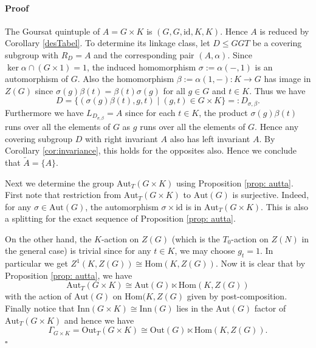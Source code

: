 \documentclass[12pt]{article}
\theoremstyle{change}
\newenvironment{proof}{\paragraph{Proof}}{\hfill$\square$}
\renewcommand{\le}{\leqslant} %
\newcommand{\Aut}{\mathrm{Aut}}
\newcommand{\Hom}{\mathrm{Hom}}
\newcommand{\id}{\mathrm{id}}
\newcommand{\Inn}{\mathrm{Inn}}
\newcommand{\Out}{\mathrm{Out}}
\newcommand{\1}{{\bf 1}}
\begin{document}
\begin{proof}
The Goursat quintuple of $A = G\times K$ is $(G, G, \id, K, K)$. Hence $A$ is reduced by Corollary \ref{desTabel}. To determine its linkage class, let $D\le GGT$ be a covering subgroup with $R_D = A$ and the corresponding pair $(A, \alpha)$. Since $\ker\alpha\cap (G\times 1) = 1$, the induced homomorphism $\sigma := \alpha(- ,1)$ is an automorphism of $G$. Also the homomorphism $\beta:= \alpha(1, -): K\to G$ has image in $Z(G)$ since $\sigma(g)\beta(t) = \beta(t)\sigma(g)$ for all $g\in G$ and $t\in K$. Thus we have 
\[
D = \{ (\sigma(g)\beta(t), g, t) \mid (g,t)\in G\times K\} =: D_{\sigma, \beta}.
\]
Furthermore we have $L_{D_{\sigma, \beta}} = A$ since for each $t\in K$, the product $\sigma(g)\beta(t)$ runs over all the elements of $G$ as $g$ runs over all the elements of $G$. Hence any covering subgroup $D$ with right invariant $A$ also has left invariant $A$. By Corollary \ref{cor:invariance}, this holds for the opposites also. Hence we conclude that $\widetilde{A} = \{A\}$.

Next we determine the group $\Aut_T(G\times K)$ using Proposition \ref{prop: autta}. First note that restriction from $\Aut_T(G\times K)$ to $\Aut(G)$ is surjective. Indeed, for any $\sigma\in\Aut(G)$, the automorphism $\sigma\times \id$ is in $\Aut_T(G\times K)$. This is also a splitting for the exact sequence of Proposition \ref{prop: autta}. 

On the other hand, the $K$-action on $Z(G)$ (which is the $T_0$-action on $Z(N)$ in the general case) is trivial since for any $t\in K$, we may choose $g_t = 1$. In particular we get $Z^1(K, Z(G)) \cong \Hom(K,Z(G))$. Now it is clear that by Proposition \ref{prop: autta}, we have
\[
\Aut_T(G\times K) \cong \Aut(G)\ltimes \Hom(K, Z(G))
\]
with the action of $\Aut(G)$ on $\Hom(K, Z(G)$ given by post-composition. Finally notice that $\Inn(G\times K) \cong \Inn(G)$ lies in the $\Aut(G)$ factor of $\Aut_T(G\times K)$ and hence we have
\[
\Gamma_{G\times K} = \Out_T(G\times K) \cong \Out(G)\ltimes \Hom(K, Z(G)).
\]
\end{proof}
\end{document}
